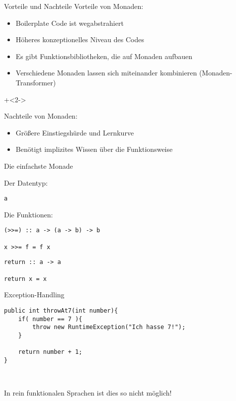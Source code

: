 \begin{frame}[fragile]{Vorteile und Nachteile}
Vorteile von Monaden:
\begin{itemize}
\item Boilerplate Code ist wegabstrahiert
\item Höheres konzeptionelles Niveau des Codes
\item Es gibt Funktionsbibliotheken, die auf Monaden aufbauen
\item Verschiedene Monaden lassen sich miteinander kombinieren (Monaden-Transformer)
\end{itemize}

\onslide+<2->
~

Nachteile von Monaden:
\begin{itemize}
\item Größere Einstiegshürde und Lernkurve
\item Benötigt implizites Wissen über die Funktionsweise
\end{itemize}

\end{frame}





\begin{frame}[fragile]{Die einfachste Monade}

Der Datentyp:
\begin{lstlisting}
a
\end{lstlisting}

Die Funktionen:
\begin{lstlisting}
(>>=) :: a -> (a -> b) -> b

x >>= f = f x
\end{lstlisting}


\begin{lstlisting}
return :: a -> a

return x = x
\end{lstlisting}

\end{frame}

\begin{frame}[fragile]{Exception-Handling}

\begin{lstlisting}
public int throwAt7(int number){
    if( number == 7 ){
        throw new RuntimeException("Ich hasse 7!");
    }
    
    return number + 1;
}
\end{lstlisting}

~

In rein funktionalen Sprachen ist dies so nicht möglich!

\end{frame}



